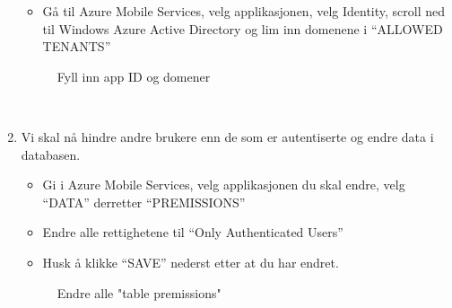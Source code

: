 \begin{enumerate}
\begin{itemize}
\item Gå til Azure Mobile Services, velg applikasjonen, velg Identity, scroll ned til Windows Azure Active Directory og lim inn domenene i “ALLOWED TENANTS”
\end{itemize}
\bigskip
\begin{figure}[H]
    \centering
    \setlength{\fboxsep}{0pt}%
    \setlength{\fboxrule}{1pt}%
    \caption{Fyll inn app ID og domener}
\end{figure}

\\
\item Vi skal nå hindre andre brukere enn de som er autentiserte og endre data i databasen. 
\begin{itemize}
\item Gi i Azure Mobile Services, velg applikasjonen du skal endre, velg “DATA” derretter “PREMISSIONS” 
\item Endre alle rettighetene til “Only Authenticated Users”
\item Husk å klikke “SAVE” nederst etter at du har endret.
\end{itemize}
\bigskip
\begin{figure}[H]
    \centering
    \setlength{\fboxsep}{0pt}%
    \setlength{\fboxrule}{1pt}%
    \caption{Endre alle "table premissions"}
\end{figure}


\end{enumerate}
